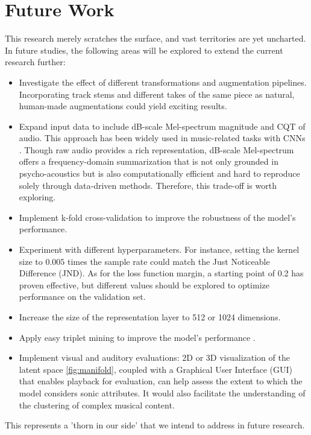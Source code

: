 \chapter{Future Work}

This research merely scratches the surface, and vast territories are yet uncharted. In future studies, the following areas will be explored to extend the current research further:

\begin{itemize}
  \item Investigate the effect of different transformations and augmentation pipelines. Incorporating track stems and different takes of the same piece as natural, human-made augmentations could yield exciting results.
  \item Expand input data to include dB-scale Mel-spectrum magnitude and CQT of audio. This approach has been widely used in music-related tasks with CNNs \cite{Kim2020OneStrategies}. Though raw audio provides a rich representation, dB-scale Mel-spectrum offers a frequency-domain summarization that is not only grounded in psycho-acoustics but is also computationally efficient and hard to reproduce solely through data-driven methods. Therefore, this trade-off is worth exploring.
  \item Implement k-fold cross-validation to improve the robustness of the model's performance.
  \item Experiment with different hyperparameters. For instance, setting the kernel size to $0.005$ times the sample rate could match the Just Noticeable Difference (JND). As for the loss function margin, a starting point of 0.2 has proven effective, but different values should be explored to optimize performance on the validation set.
  \item Increase the size of the representation layer to 512 or 1024 dimensions.
  \item Apply easy triplet mining to improve the model's performance \cite{XuanImprovedMining}.
  \item Implement visual and auditory evaluations: 2D or 3D visualization of the latent space \ref{fig:manifold}, coupled with a Graphical User Interface (GUI) that enables playback for evaluation, can help assess the extent to which the model considers sonic attributes. It would also facilitate the understanding of the clustering of complex musical content. 
\end{itemize}

This represents a 'thorn in our side' that we intend to address in future research.

\newpage